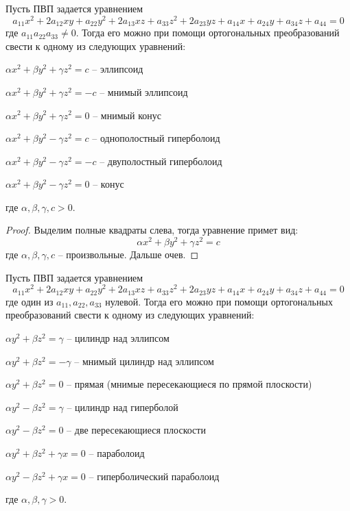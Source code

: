 \begin{Thm}
	Пусть ПВП задается уравнением
	\[a_{11} x^2 + 2a_{12} xy + a_{22} y^2 + 2a_{13} xz + a_{33} z^2 + 2a_{23} yz + a_{14} x + a_{24} y + a_{34} z + a_{44} = 0\]
	где $a_{11} a_{22} a_{33} \neq 0$. Тогда его можно при помощи ортогональных преобразований свести к одному из следующих уравнений:

	\begin{MyList}
		\item $\alpha x^2 + \beta y^2 + \gamma z^2 = c$ -- эллипсоид
		\item $\alpha x^2 + \beta y^2 + \gamma z^2 = -c$ -- мнимый эллипсоид
		\item $\alpha x^2 + \beta y^2 + \gamma z^2 = 0$ -- мнимый конус
		\item $\alpha x^2 + \beta y^2 - \gamma z^2 = c$ -- однополостный гиперболоид 
		\item $\alpha x^2 + \beta y^2 - \gamma z^2 = -c$ -- двуполостный гиперболоид
		\item $\alpha x^2 + \beta y^2 - \gamma z^2 = 0$ -- конус
	\end{MyList}
	где $\alpha, \beta, \gamma, c > 0$.
\end{Thm}

\begin{proof}
	Выделим полные квадраты слева, тогда уравнение примет вид:
	\[\alpha x^2 + \beta y^2 + \gamma z^2 = c\]
	где $\alpha, \beta, \gamma, c$ -- произвольные. Дальше очев.
\end{proof}

\begin{Thm}
	Пусть ПВП задается уравнением
	\[a_{11} x^2 + 2a_{12} xy + a_{22} y^2 + 2a_{13} xz + a_{33} z^2 + 2a_{23} yz + a_{14} x + a_{24} y + a_{34} z + a_{44} = 0\]
	где один из $a_{11}, a_{22}, a_{33}$ нулевой. Тогда его можно при помощи ортогональных преобразований свести к одному из следующих уравнений:

	\begin{MyList}
		\item $\alpha y^2 + \beta z^2 = \gamma$ -- цилиндр над эллипсом
		\item $\alpha y^2 + \beta z^2 = - \gamma$ -- мнимый цилиндр над эллипсом
		\item $\alpha y^2 + \beta z^2 = 0$ -- прямая (мнимые пересекающиеся по прямой плоскости)
		\item $\alpha y^2 - \beta z^2 = \gamma$ -- цилиндр над гиперболой
		\item $\alpha y^2 - \beta z^2 = 0$ -- две пересекающиеся плоскости
		\item $\alpha y^2 + \beta z^2 + \gamma x = 0$ -- параболоид
		\item $\alpha y^2 - \beta z^2 + \gamma x = 0$ -- гиперболический параболоид
	\end{MyList}
	где $\alpha, \beta, \gamma > 0$.
\end{Thm}

